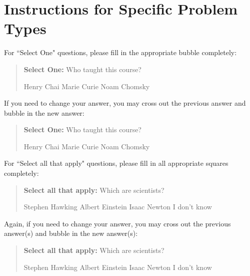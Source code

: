 \documentclass[11pt,addpoints,answers]{exam}
\newcommand{\blackcircle}{\tikz\draw[black,fill=black] (0,0) circle (1ex);}
\begin{document}
\section*{Instructions for Specific Problem Types}

For ``Select One" questions, please fill in the appropriate bubble completely:

\begin{quote}
\textbf{Select One:} Who taught this course?
    \begin{checkboxes}
     \CorrectChoice Henry Chai
     \choice Marie Curie
     \choice Noam Chomsky
    \end{checkboxes}
\end{quote}

If you need to change your answer, you may cross out the previous answer and bubble in the new answer:

\begin{quote}
\textbf{Select One:} Who taught this course?
    {
    \begin{checkboxes}
     \CorrectChoice Henry Chai
     \choice Marie Curie \checkboxchar{\xcancel{\blackcircle}{}}
     \choice Noam Chomsky
    \end{checkboxes}
    }
\end{quote}

For ``Select all that apply" questions, please fill in all appropriate squares completely:

\begin{quote}
\textbf{Select all that apply:} Which are scientists?
    {%
    \checkboxchar{$\Box$} \checkedchar{$\blacksquare$} %
    \begin{checkboxes}
    \CorrectChoice Stephen Hawking 
    \CorrectChoice Albert Einstein
    \CorrectChoice Isaac Newton
    \choice I don't know
    \end{checkboxes}
    }
\end{quote}

Again, if you need to change your answer, you may cross out the previous answer(s) and bubble in the new answer(s):

\begin{quote}
\textbf{Select all that apply:} Which are scientists?
    {%
    \checkboxchar{\xcancel{$\blacksquare$}} \checkedchar{$\blacksquare$} %
    \begin{checkboxes}
    \CorrectChoice Stephen Hawking 
    \CorrectChoice Albert Einstein
    \CorrectChoice Isaac Newton
    \choice I don't know
    \end{checkboxes}
    }
\end{quote}
\end{document}
